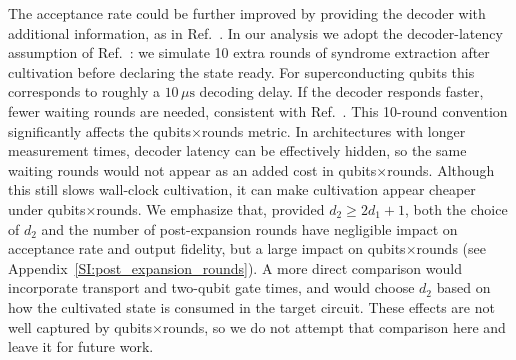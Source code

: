 \documentclass[twocolumn,notitlepage,nofootinbib,floatfix,superscriptaddress]{revtex4-1}
\begin{document}
The acceptance rate could be further improved by providing the decoder with additional information, as in Ref.~\cite{chen2025efficient}. In our analysis we adopt the decoder-latency assumption of Ref.~\cite{gidney2024magic}: we simulate 10 extra rounds of syndrome extraction after cultivation before declaring the state ready. For superconducting qubits this corresponds to roughly a $10\,\mu\mathrm{s}$ decoding delay. If the decoder responds faster, fewer waiting rounds are needed, consistent with Ref.~\cite{chen2025efficient}. This 10-round convention significantly affects the qubits$\times$rounds metric. In architectures with longer measurement times, decoder latency can be effectively hidden, so the same waiting rounds would not appear as an added cost in qubits$\times$rounds. Although this still slows wall-clock cultivation, it can make cultivation appear cheaper under qubits$\times$rounds. We emphasize that, provided $d_2 \ge 2d_1+1$, both the choice of $d_2$ and the number of post-expansion rounds have negligible impact on acceptance rate and output fidelity, but a large impact on qubits$\times$rounds (see Appendix~\ref{SI:post_expansion_rounds}). A more direct comparison would incorporate transport and two-qubit gate times, and would choose $d_2$ based on how the cultivated state is consumed in the target circuit. These effects are not well captured by qubits$\times$rounds, so we do not attempt that comparison here and leave it for future work.
\end{document}
